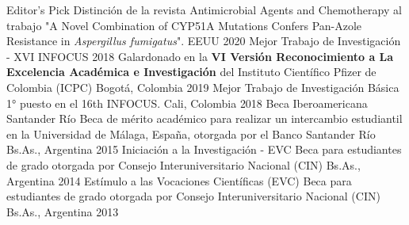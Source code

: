 


\begin{cvhonors}

  \cvhonor
    {Editor's Pick} %
    {Distinción de la revista Antimicrobial Agents and Chemotherapy al trabajo "A Novel Combination of CYP51A Mutations Confers Pan-Azole Resistance in \textit{Aspergillus fumigatus}".} %
    {EEUU} %
    {2020} %
  \cvhonor
    {Mejor Trabajo de Investigación - XVI INFOCUS 2018} %
    {Galardonado en la \textbf{VI Versión Reconocimiento a La Excelencia Académica e Investigación} del Instituto Científico Pfizer de Colombia (ICPC) } %
    {Bogotá, Colombia} %
    {2019} %
  \cvhonor
    {Mejor Trabajo de Investigación Básica} %
    {1° puesto en el 16th INFOCUS.} %
    {Cali, Colombia} %
    {2018} %
  \cvhonor
    {Beca Iberoamericana Santander Río} %
    {Beca de mérito académico para realizar un intercambio estudiantil en la Universidad de Málaga, España, otorgada por el Banco Santander Río} %
    {Bs.As., Argentina} %
    {2015} %
  \cvhonor
    {Iniciación a la Investigación - EVC} %
    {Beca para estudiantes de grado otorgada por Consejo Interuniversitario Nacional (CIN)} %
    {Bs.As., Argentina} %
    {2014} %
  \cvhonor
    {Estímulo a las Vocaciones Científicas (EVC)} %
    {Beca para estudiantes de grado otorgada por Consejo Interuniversitario Nacional (CIN)} %
    {Bs.As., Argentina} %
    {2013} %


\end{cvhonors}